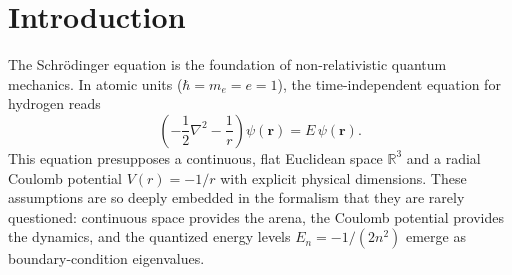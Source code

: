 \documentclass[aps,pra,twocolumn,superscriptaddress,longbibliography]{revtex4-2}
\begin{document}
\begin{abstract}
quantization $p_0 = Z/n$ itself is forced by the eigenvalue $2\pi^2/n = \mathrm{Vol}(S^3)/n$ of Fock's $S^3$ Coulomb kernel on the degree-$(n-1)$ harmonics. \textbf{[PRIOR ART]} That eigenvalue holds for every $n$ (Fock 1935;\ the Funk--Hecke theorem); we verify it in exact arithmetic for $n \le 4$ and every $l < n$ (one real harmonic per $l$) without inputting $E_n$ (\texttt{tests/test\_paper7\_fock\_kernel.py}). \textbf{[SYMBOLIC PROOF + MEASURED]} At positive energy the projection lands on the hyperboloid $H^3$:\ continuing $n \to iZ/k$ releases only the cap $l \le n-1$, and every continuum density tested is the continued bound one times the single factor $1/(1-e^{-2\pi Z/k})$, the ratio of the two normalizations (Section~\ref{sec:continuum}, \texttt{tests/test\_paper7\_hydrogen\_continuum\_door.py});\ the factor is standard quantum defect theory~\cite{Seaton1983}. At $E = 0$, the third shape, the Runge--Lenz algebra contracts to the Euclidean group and both sides meet one $\pi$-free threshold function. \textbf{[SYMBOLIC PROOF]} The projection geometry is audited by a suite of 18 symbolic checks (ten of them limiting-case, definitional or non-discriminating) covering the stereographic map, the conformal Laplacian and its $l = 0$ spectrum, and the (definitional) eigenvalue-to-energy bookkeeping.
\end{abstract}

\maketitle


\section{Introduction}
\label{sec:intro}

The Schr\"odinger equation is the foundation of non-relativistic quantum mechanics. In atomic units ($\hbar = m_e = e = 1$), the time-independent equation for hydrogen reads
\begin{equation}
\left( -\frac{1}{2}\nabla^2 - \frac{1}{r} \right) \psi(\mathbf{r}) = E\,\psi(\mathbf{r}).
\label{eq:schrodinger}
\end{equation}
This equation presupposes a continuous, flat Euclidean space $\mathbb{R}^3$ and a radial Coulomb potential $V(r) = -1/r$ with explicit physical dimensions. These assumptions are so deeply embedded in the formalism that they are rarely questioned: continuous space provides the arena, the Coulomb potential provides the dynamics, and the quantized energy levels $E_n = -1/(2n^2)$ emerge as boundary-condition eigenvalues.
\end{document}
